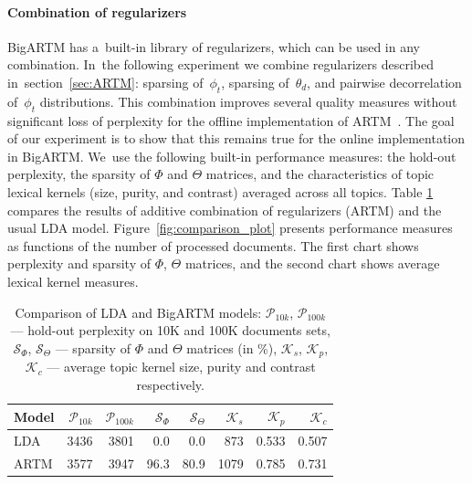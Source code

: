 \documentclass{acm_proc_article-sp}
\begin{document}
\paragraph{Combination of regularizers}

\mbox{BigARTM} has a~built-in library of regularizers, which can be used in any combination.
In~the following experiment we combine regularizers described in~section~\ref{sec:ARTM}:
sparsing of~$\phi_{t}$, sparsing of~$\theta_{d}$, and pairwise decorrelation of~$\phi_{t}$ distributions.
This combination improves several quality measures without significant loss of perplexity
for the offline implementation of ARTM~\cite{voron14aist}.
The goal of our experiment is to show that this remains true
for the online implementation in BigARTM.
We~use the following built-in performance measures:
the hold-out perplexity,
the sparsity of $\Phi$ and $\Theta$ matrices, and
the characteristics of topic lexical kernels (size, purity, and contrast) averaged across all topics.
%
Table \ref{tab:model_comparison} compares the results of additive combination of regularizers (ARTM) and the usual LDA model.
Figure~\ref{fig:comparison_plot} presents performance measures as functions of the number of processed documents.
The first chart shows perplexity and sparsity of $\Phi$, $\Theta$ matrices, and
the second chart shows average lexical kernel measures.

\begin{table}[t]
    \caption{Comparison of LDA and BigARTM models:
        $\mathcal{P}_{10k}$, $\mathcal{P}_{100k}$ --- hold-out perplexity on 10K and 100K documents sets,
        $\mathcal{S}_{\Phi}$, $\mathcal{S}_{\Theta}$ --- sparsity of $\Phi$ and $\Theta$ matrices (in \%),
        $\mathcal{K}_{s}$, $\mathcal{K}_{p}$, $\mathcal{K}_{c}$ --- average topic kernel size, purity and contrast respectively.}
    \label{tab:model_comparison}
    \centering\tabcolsep=4.6pt
    \begin{tabular}[t]{l|rrrrrrr}
    \hline
    Model & $\mathcal{P}_{10k}$ & $\mathcal{P}_{100k}$ &  $\mathcal{S}_{\Phi}$ & $\mathcal{S}_{\Theta}$ &  $\mathcal{K}_{s}$ & $\mathcal{K}_{p}$ &  $\mathcal{K}_{c}$ \\
    \hline
        LDA    & 3436 & 3801 & 0.0  & 0.0  & 873  & 0.533 & 0.507 \\
        ARTM   & 3577 & 3947 & 96.3 & 80.9 & 1079 & 0.785 & 0.731 \\
    \hline

    \end{tabular}
\end{table}
\end{document}
